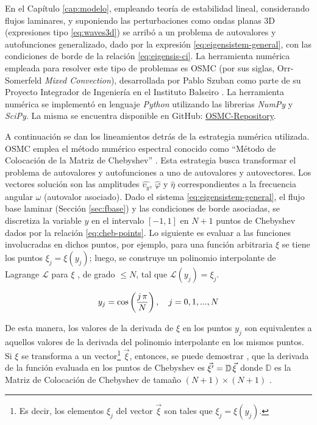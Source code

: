 En el Capítulo \ref{cap:modelo}, empleando teoría de estabilidad lineal, considerando flujos laminares, y suponiendo las perturbaciones como ondas planas 3D (expresiones tipo \ref{eq:waves3d}) se arribó a un problema de autovalores y autofunciones generalizado, dado por la expresión \ref{eq:eigensistem-general}, con las condiciones de borde de la relación \ref{eq:eigensis-ci}. La herramienta numérica empleada para resolver este tipo de problemas es OSMC (por sus siglas, Orr-Somerfeld \textit{Mixed Convection}), desarrollada por Pablo Szuban como parte de su Proyecto Integrador de Ingeniería en el Instituto Balseiro \cite{szuban2023}. La herramienta numérica se implementó en lenguaje \textit{Python} utilizando las librerias \textit{NumPy} y \textit{SciPy}. La misma se encuentra disponible en GitHub: \href{https://github.com/Pato4184/OSMC-Repository}{OSMC-Repository}.

A continuación se dan los lineamientos detrás de la estrategia numérica utilizada. OSMC emplea el método numérico espectral conocido como ``Método de Colocación de la Matriz de Chebyshev'' \cite{moin2010fundamentals}. Esta estrategia busca transformar el problema de autovalores y autofunciones a uno de autovalores y autovectores. Los vectores solución son las amplitudes $\widehat{v_y}$, $\widehat{\varphi}$ y $\widehat{\eta}$ correspondientes a la frecuencia angular $\omega$ (autovalor asociado). Dado el sistema \ref{eq:eigensistem-general}, el flujo base laminar (Sección \ref{sec:fbase}) y las condiciones de borde asociadas, se discretiza la variable $y$ en el intervalo $\left[-1,1\right]$ en $N+1$ puntos de Chebyshev dados por la relación \ref{eq:cheb-points}. Lo siguiente es evaluar a las funciones involucradas en dichos puntos, por ejemplo, para una función arbitraria $\xi$ se tiene los puntos $\xi_j = \xi(y_j)$; luego, se construye un polinomio interpolante de Lagrange $\mathcal{L}$ para $\xi$ , de grado $\leq N$, tal que $\mathcal{L}(y_j) = \xi_j$.

\begin{equation}
y_j = \cos \left( \frac{j \hspace{0.5mm} \pi}{N} \right), \quad j=0,1,...,N 
\label{eq:cheb-points}
\end{equation}

De esta manera, los valores de la derivada de $\xi$ en los puntos $y_j$ son equivalentes a aquellos valores de la derivada del polinomio interpolante en los mismos puntos. Si $\xi$ se transforma a un vector\footnote{Es decir, los elementos $\xi_j$ del vector $\vec{\xi}$ son tales que $\xi_j = \xi(y_j)$.} $\vec{\xi}$, entonces, se puede demostrar \cite{moin2010fundamentals}, que la derivada de la función evaluada en los puntos de Chebyshev es $\vec{\xi^{\prime}} = \mathbb{D} \hspace{0.4mm} \vec{\xi}$ donde $\mathbb{D}$ es la Matriz de Colocación de Chebyshev de tamaño $(N+1) \times (N+1)$ \cite{trefethen}.

